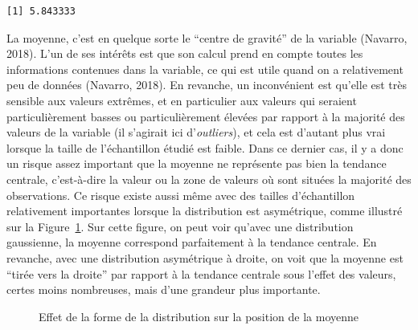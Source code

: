 \documentclass[
  letterpaper,
]{book}
\begin{document}
\begin{verbatim}
[1] 5.843333
\end{verbatim}

La moyenne, c'est en quelque sorte le ``centre de gravité'' de la
variable (Navarro, 2018). L'un de ses intérêts est que son calcul prend
en compte toutes les informations contenues dans la variable, ce qui est
utile quand on a relativement peu de données (Navarro, 2018). En
revanche, un inconvénient est qu'elle est très sensible aux valeurs
extrêmes, et en particulier aux valeurs qui seraient particulièrement
basses ou particulièrement élevées par rapport à la majorité des valeurs
de la variable (il s'agirait ici d'\emph{outliers}), et cela est
d'autant plus vrai lorsque la taille de l'échantillon étudié est faible.
Dans ce dernier cas, il y a donc un risque assez important que la
moyenne ne représente pas bien la tendance centrale, c'est-à-dire la
valeur ou la zone de valeurs où sont situées la majorité des
observations. Ce risque existe aussi même avec des tailles d'échantillon
relativement importantes lorsque la distribution est asymétrique, comme
illustré sur la Figure~\ref{fig-meansSkewedVariables}. Sur cette figure,
on peut voir qu'avec une distribution gaussienne, la moyenne correspond
parfaitement à la tendance centrale. En revanche, avec une distribution
asymétrique à droite, on voit que la moyenne est ``tirée vers la
droite'' par rapport à la tendance centrale sous l'effet des valeurs,
certes moins nombreuses, mais d'une grandeur plus importante.

\begin{figure}


\caption{\label{fig-meansSkewedVariables}Effet de la forme de la
distribution sur la position de la moyenne}

\end{figure}%
\end{document}
